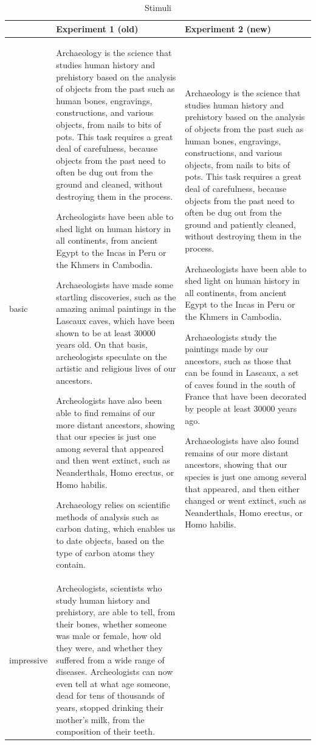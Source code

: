 \documentclass[
  doc,floatsintext]{apa6}
\begin{document}
\begin{longtable}[t]{>{\raggedright\arraybackslash}p{5em}>{\raggedright\arraybackslash}p{20em}>{\raggedright\arraybackslash}p{20em}}
\caption{\label{tab:stimuli}Stimuli}\\
\toprule
 & Experiment 1 (old) & Experiment 2 (new)\\
\midrule
basic & Archaeology is the science that studies human history and prehistory based on the analysis of objects from the past such as human bones, engravings, constructions, and various objects, from nails to bits of pots. This task requires a great deal of carefulness, because objects from the past need to often be dug out from the ground and cleaned, without destroying them in the process. 

Archeologists have been able to shed light on human history in all continents, from ancient Egypt to the Incas in Peru or the Khmers in Cambodia. 

Archaeologists have made some startling discoveries, such as the amazing animal paintings in the Lascaux caves, which have been shown to be at least 30000 years old. On that basis, archeologists speculate on the artistic and religious lives of our ancestors. 

Archeologists have also been able to find remains of our more distant ancestors, showing that our species is just one among several that appeared and then went extinct, such as Neanderthals, Homo erectus, or Homo habilis. 

Archaeology relies on scientific methods of analysis such as carbon dating, which enables us to date objects, based on the type of carbon atoms they contain. & Archaeology is the science that studies human history and prehistory based on the analysis of objects from the past such as human bones, engravings, constructions, and various objects, from nails to bits of pots. This task requires a great deal of carefulness, because objects from the past need to often be dug out from the ground and patiently cleaned, without destroying them in the process.

Archaeologists have been able to shed light on human history in all continents, from ancient Egypt to the Incas in Peru or the Khmers in Cambodia.

Archaeologists study the paintings made by our ancestors, such as those that can be found in Lascaux, a set of caves found in the south of France that have been decorated by people at least 30000 years ago.

Archaeologists have also found remains of our more distant ancestors, showing that our species is just one among several that appeared, and then either changed or went extinct, such as Neanderthals, Homo erectus, or Homo habilis.\\
impressive & Archeologists, scientists who study human history and prehistory, are able to tell, from their bones, whether someone was male or female, how old they were, and whether they suffered from a wide range of diseases. Archeologists can now even tell at what age someone, dead for tens of thousands of years, stopped drinking their mother’s milk, from the composition of their teeth. 


\end{longtable}
\end{document}
